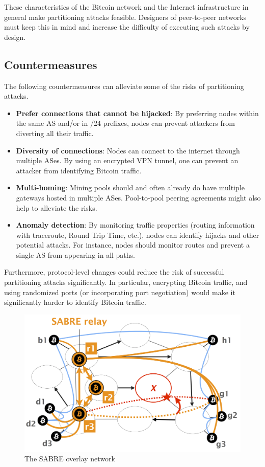 \documentclass[12pt]{article}
\begin{document}
These characteristics of the Bitcoin network and the Internet infrastructure in general make partitioning attacks feasible. Designers of peer-to-peer networks must keep this in mind and increase the difficulty of executing such attacks by design.

\subsection{Countermeasures}
\label{subsec:part-counter}

The following countermeasures can alleviate some of the risks of partitioning attacks.

\begin{itemize}
    \item \textbf{Prefer connections that cannot be hijacked}: By preferring nodes within the same AS and/or in /24 prefixes, nodes can prevent attackers from diverting all their traffic.

    \item \textbf{Diversity of connections}: Nodes can connect to the internet through multiple ASes. By using an encrypted VPN tunnel, one can prevent an attacker from identifying Bitcoin traffic.

    \item \textbf{Multi-homing}: Mining pools should and often already do have multiple gateways hosted in multiple ASes. Pool-to-pool peering agreements might also help to alleviate the risks.

    \item \textbf{Anomaly detection}: By monitoring traffic properties (routing information with traceroute, Round Trip Time, etc.), nodes can identify hijacks and other potential attacks. For instance, nodes should monitor routes and prevent a single AS from appearing in all paths.
\end{itemize}

Furthermore, protocol-level changes could reduce the risk of successful partitioning attacks significantly. In particular, encrypting Bitcoin traffic, and using randomized ports (or incorporating port negotiation) would make it significantly harder to identify Bitcoin traffic.

\begin{figure} [h!]
\centering
\includegraphics[width=0.7\columnwidth]{images/sabre.png}
\caption{The SABRE overlay network \cite{SABRE}}
\label{fig:sabre}
\end{figure}
\end{document}
